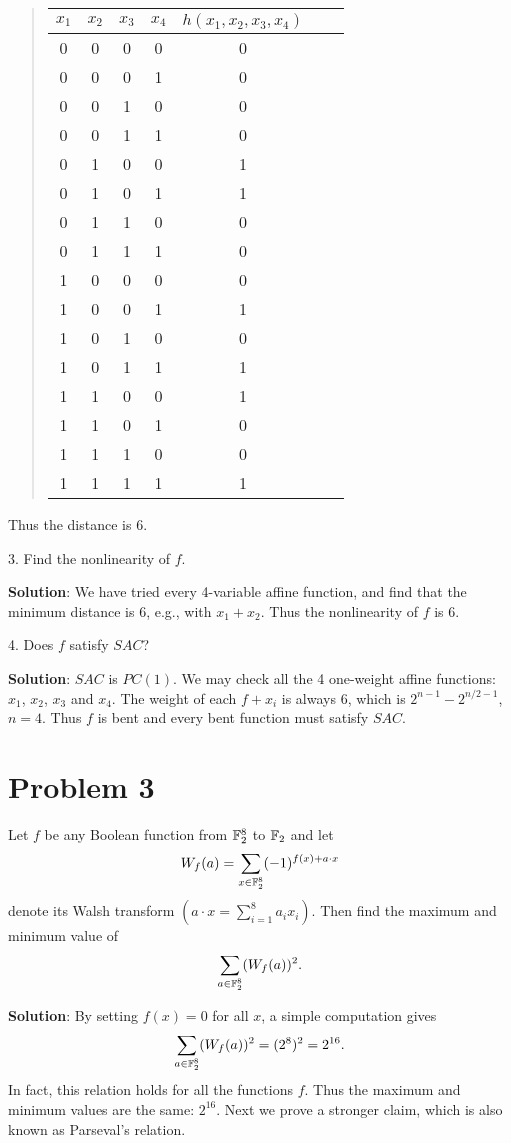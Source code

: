 \documentclass[12pt]{article}
\theoremstyle{plain}
\begin{document}
\begin{quote}
\begin{tabular}{c c c c| c || c || c }
$x_1$ & $x_2$ & $x_3$ & $x_4$ & $h(x_1, x_2, x_3, x_4)$ \\
\hline
0 & 0 & 0 & 0 & 0 \\
0 & 0 & 0 & 1 & 0 \\
0 & 0 & 1 & 0 & 0 \\
0 & 0 & 1 & 1 & 0 \\
0 & 1 & 0 & 0 & 1 \\
0 & 1 & 0 & 1 & 1 \\
0 & 1 & 1 & 0 & 0 \\
0 & 1 & 1 & 1 & 0 \\
1 & 0 & 0 & 0 & 0 \\
1 & 0 & 0 & 1 & 1 \\
1 & 0 & 1 & 0 & 0 \\
1 & 0 & 1 & 1 & 1 \\
1 & 1 & 0 & 0 & 1 \\
1 & 1 & 0 & 1 & 0 \\
1 & 1 & 1 & 0 & 0 \\
1 & 1 & 1 & 1 & 1 \\
\end{tabular}
\end{quote}
Thus the distance is 6.

3. Find the nonlinearity of $f$.

{\bf Solution}: We have tried every 4-variable affine function, and find that the minimum distance is 6, e.g., with $x_1 + x_2$. Thus the nonlinearity of $f$ is 6.

4. Does $f$ satisfy $SAC$?

{\bf Solution}: $SAC$ is $PC(1)$. We may check all the 4 one-weight affine functions: $x_1$, $x_2$, $x_3$ and $x_4$. The weight of each $f+x_i$ is always 6, which is $2^{n-1} - 2^{n/2-1}$, $n=4$. Thus $f$ is bent and every bent function must satisfy $SAC$.


\section{Problem 3}
Let $f$ be any Boolean function from $\mathbb{F}_2^8$ to $\mathbb{F}_2$ and let 
$$W_f(a) = \sum_{x\in \mathbb{F}_2^8} (-1)^{f(x)+a\cdot x}$$
denote its Walsh transform $(a\cdot x = \sum_{i=1}^8 a_i x_i)$. Then find the maximum and minimum value of
$$\sum_{a \in \mathbb{F}_2^8}(W_f(a))^2.$$

{\bf Solution}: By setting $f(x)=0$ for all $x$, a simple computation gives 
$$\sum_{a \in \mathbb{F}_2^8}(W_f(a))^2 = (2^8)^2 = 2^{16}.$$
In fact, this relation holds for all the functions $f$. Thus the maximum and minimum values are the same: $2^{16}$. 
Next we prove a stronger claim, which is also known as Parseval's relation.
\end{document}
